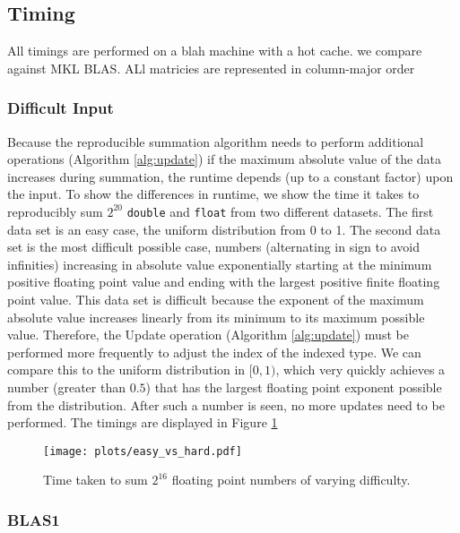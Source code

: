 \subsection{Timing}
  All timings are performed on a blah machine with a hot cache. we compare against MKL BLAS. ALl matricies are represented in column-major order
  \subsubsection{Difficult Input}
    Because the reproducible summation algorithm needs to perform additional operations (Algorithm \ref{alg:update}) if the maximum absolute value of the data increases during summation, the runtime depends (up to a constant factor) upon the input. To show the differences in runtime, we show the time it takes to reproducibly sum $2^20$ \texttt{double} and \texttt{float} from two different datasets. The first data set is an easy case, the uniform distribution from 0 to 1. The second data set is the most difficult possible case, numbers (alternating in sign to avoid infinities) increasing in absolute value exponentially starting at the minimum positive floating point value and ending with the largest positive finite floating point value. This data set is difficult because the exponent of the maximum absolute value increases linearly from its minimum to its maximum possible value. Therefore, the Update operation (Algorithm \ref{alg:update}) must be performed more frequently to adjust the index of the indexed type. We can compare this to the uniform distribution in $[0, 1)$, which very quickly achieves a number (greater than $0.5$) that has the largest floating point exponent possible from the distribution. After such a number is seen, no more updates need to be performed. The timings are displayed in Figure \ref{fig:easy_vs_hard_timings}
  \begin{figure}[H]
  \begin{center}
  \texttt{[image: plots/easy\_vs\_hard.pdf]}
  \caption{Time taken to sum $2^{16}$ floating point numbers of varying difficulty.}
  \label{fig:easy_vs_hard_timings}
  \end{center}
  \end{figure}
  \subsubsection{BLAS1}

